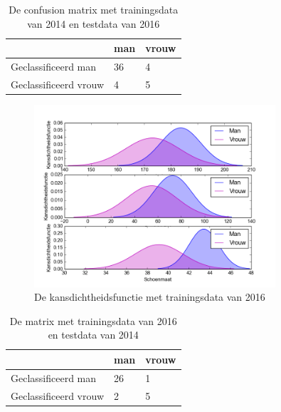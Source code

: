\documentclass[a4paper,12px]{article}
\begin{document}
\begin{table}[h]
\begin{tabular}{l|ll}
                      & man & vrouw \\\hline
Geclassificeerd man   & 36 & 4 \\
Geclassificeerd vrouw & 4  & 5 \\
\end{tabular}
\caption{De confusion matrix met trainingsdata van 2014 en testdata van 2016}
\end{table}

\begin{figure}[h!]
    \centering
    \includegraphics[width=0.8\textwidth]{sex16.png}
    \caption{De kansdichtheidsfunctie met trainingsdata van 2016}
    \label{fig:sex_image}
\end{figure}
\FloatBarrier

\begin{table}[h]
\begin{tabular}{l|ll}
                      & man & vrouw \\\hline
Geclassificeerd man   & 26 & 1 \\
Geclassificeerd vrouw & 2  & 5 \\
\end{tabular}
\caption{De matrix met trainingsdata van 2016 en testdata van 2014}
\end{table}



% 
% 
\end{document}

